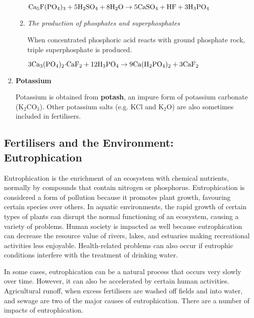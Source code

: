 \begin{enumerate}
\begin{enumerate}
\begin{center}
$\rm{Ca_{5}F(PO_{4})_{3} + 5H_{2}SO_{4} + 8H_{2}O \rightarrow 5CaSO_{4} + HF + 3H_{3}PO_{4}}$
\end{center} 

\item{\textit{The production of phosphates and superphosphates}}

When concentrated phosphoric acid reacts with ground phosphate rock, triple superphosphate is produced.

\begin{center}
$\rm{3Ca_{3}(PO_{4})_{2}{\cdot}CaF_{2} + 12H_{3}PO_{4} \rightarrow 9Ca(H_{2}PO_{4})_{2} + 3CaF_{2}}$ 
\end{center}
	\end{enumerate}

\item{\textbf{Potassium}}

Potassium is obtained from \textbf{potash}, an impure form of potassium carbonate (K$_{2}$CO$_{3}$). Other potassium salts (e.g. KCl and K$_{2}$O) are also sometimes included in fertilisers.

\end{enumerate}

\subsection{Fertilisers and the Environment: Eutrophication}

Eutrophication is the enrichment of an ecosystem with chemical nutrients, normally by compounds that contain nitrogen or phosphorus. Eutrophication is considered a form of pollution because it promotes plant growth, favouring certain species over others. In aquatic environments, the rapid growth of  certain types of plants can disrupt the normal functioning of an ecosystem, causing a variety of problems. Human society is impacted as well because eutrophication can decrease the resource value of rivers, lakes, and estuaries making recreational activities less enjoyable. Health-related problems can also occur if eutrophic conditions interfere with the treatment of drinking water.


In some cases, eutrophication can be a natural process that occurs very slowly over time. However, it can also be accelerated by certain human activities. Agricultural runoff, when excess fertilisers are washed off fields and into water, and sewage are two of the major causes of eutrophication. There are a number of impacts of eutrophication.

